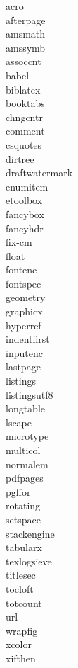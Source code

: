 \begin{appendices}
\begin{multicols}{3}
    \noindent
    acro\\
    afterpage\\
    amsmath\\
    amssymb\\
    assoccnt\\
    babel\\
    biblatex\\
    booktabs\\
    chngcntr\\
    comment\\
    csquotes\\
    dirtree\\
    draftwatermark\\
    enumitem\\
    etoolbox\\
    fancybox\\
    fancyhdr\\
    fix-cm\\
    float\\
    fontenc\\
    fontspec\\
    geometry\\
    graphicx\\
    hyperref\\
    indentfirst\\
    inputenc\\
    lastpage\\
    listings\\
    listingsutf8\\
    longtable\\
    lscape\\
    microtype\\
    multicol\\
    normalem\\
    pdfpages\\
    pgffor\\
    rotating\\
    setspace\\
    stackengine\\
    tabularx\\
    texlogsieve\\
    titlesec\\
    tocloft\\
    totcount\\
    url\\
    wrapfig\\
    xcolor\\
    xifthen

\end{multicols}
\end{appendices}